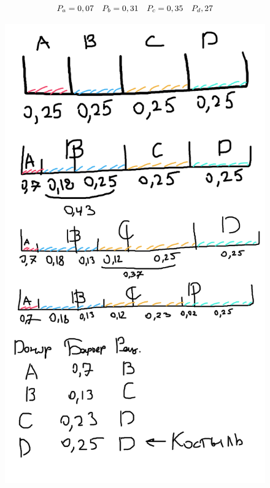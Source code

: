 \documentclass[discrete.tex]{subfiles}
\begin{document}
\begin{Example}
    \[P_a = 0,07 \quad P_b = 0,31 \quad P_c = 0,35 \quad P_d,27\]
    \begin{figure}[H]
        \includegraphics[scale=1.3]{pics/walker.png}
        \centering
    \end{figure}
    
\end{Example}
\end{document}
